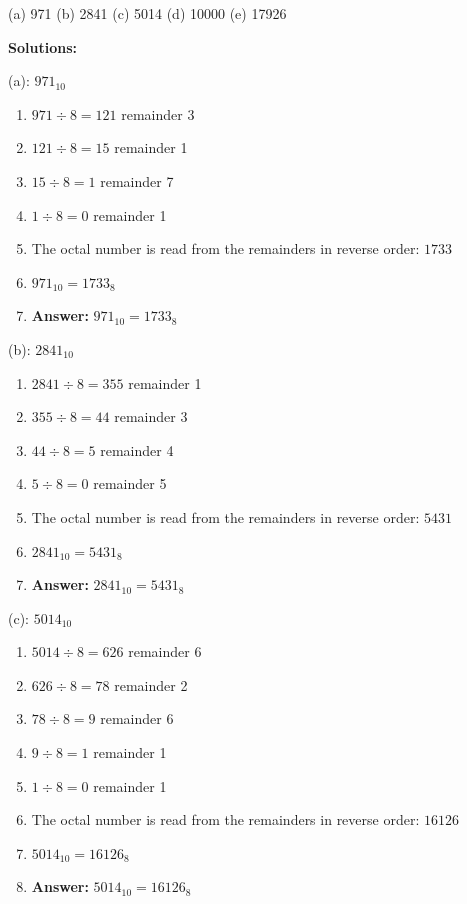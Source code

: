 \documentclass{article}
\begin{document}
(a) 971 (b) 2841 (c) 5014 (d) 10000 (e) 17926

\vspace*{0.5cm}

\noindent \textbf{Solutions:}

\vspace*{0.25cm}

\noindent (a): $971_{10}$

\begin{enumerate}
    \item $971 \div 8 = 121$ remainder 3
    \item $121 \div 8 = 15$ remainder 1
    \item $15 \div 8 = 1$ remainder 7
    \item $1 \div 8 = 0$ remainder 1
    \item The octal number is read from the remainders in reverse order: $1733$
    \item $971_{10} = 1733_8$
    \item \textbf{Answer:} $971_{10} = 1733_8$
\end{enumerate}

\vspace*{0.5cm}

\noindent (b): $2841_{10}$

\begin{enumerate}
    \item $2841 \div 8 = 355$ remainder 1
    \item $355 \div 8 = 44$ remainder 3
    \item $44 \div 8 = 5$ remainder 4
    \item $5 \div 8 = 0$ remainder 5
    \item The octal number is read from the remainders in reverse order: $5431$
    \item $2841_{10} = 5431_8$
    \item \textbf{Answer:} $2841_{10} = 5431_8$
\end{enumerate}

\vspace*{0.5cm}

\noindent (c): $5014_{10}$

\begin{enumerate}
    \item $5014 \div 8 = 626$ remainder 6
    \item $626 \div 8 = 78$ remainder 2
    \item $78 \div 8 = 9$ remainder 6
    \item $9 \div 8 = 1$ remainder 1
    \item $1 \div 8 = 0$ remainder 1
    \item The octal number is read from the remainders in reverse order: $16126$
    \item $5014_{10} = 16126_8$
    \item \textbf{Answer:} $5014_{10} = 16126_8$
\end{enumerate}
\end{document}
